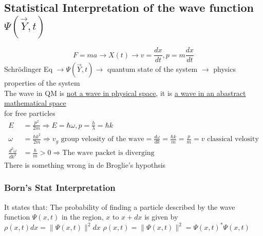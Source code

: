 \documentclass[12pt, a4paper]{article}
\begin{document}
\subsection{Statistical Interpretation of the wave function $\Psi(\vec{Y},t)$}
$$F=ma\rightarrow X(t) \rightarrow v=\frac{dx}{dt},p=m\frac{dx}{dt}$$
Schr\"odinger Eq $\rightarrow \Psi(\vec{Y},t)\rightarrow$ quantum state of the system $\rightarrow$ physics properties of the system \\
The wave in QM is \underline{not a wave in physical space}, it is \underline{a wave in an abastract mathematical space}\\
for free particles
\begin{align*}
E&=\frac{p^2}{2m}\Rightarrow E=\hbar \omega, p=\frac{h}{\lambda}=\hbar k\\
\omega &= \frac{\hbar k^2}{2m} \Rightarrow v_g \text{ group velosity of the wave} = \frac{d\omega}{dk}=\frac{\hbar k}{m}=\frac{p}{m}=v \text{ classical velosity}\\
\frac{d^2\omega}{dk^2}&=\frac{\hbar}{m} > 0 \Rightarrow \text{The wave packet is diverging}
\end{align*}
There is something wrong in de Broglie's hypothsis
\subsubsection{Born's Stat Interpretation}
It states that: The probability of finding a particle described by the wave function $\Psi (x,t)$ in the region, $x$ to $x+dx$ is given by $\rho(x,t)dx = \| \Psi(x,t) \|^2 dx$
$\rho(x,t)=\| \Psi(x,t) \|^2 = \Psi(x,t)^*\Psi(x,t)$
\end{document}
